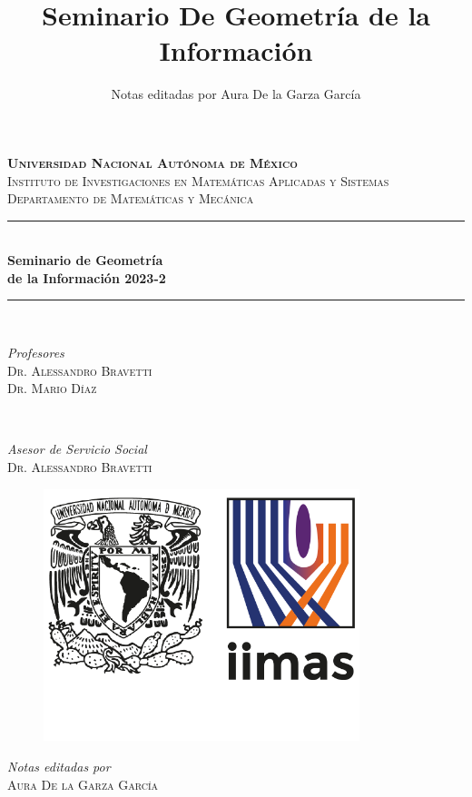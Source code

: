 \documentclass[12pt,a4paper,twoside]{report}
\title{\bfseries{Seminario De Geometr\'ia de la Informaci\'on}}
\author{Notas editadas por Aura De la Garza Garc\'ia}
\date{}
\theoremstyle{definition}
\begin{document}
\begin{titlepage} 
	\newcommand{\HRule}{\rule{\linewidth}{0.5mm}} 
	
	\center 
	\textsc{\LARGE \textbf{Universidad Nacional Aut\'onoma de M\'exico}}\\[0.9cm] 
	
	\textsc{\Large Instituto de Investigaciones en Matemáticas Aplicadas y Sistemas}\\[0.5cm] 
	
	\textsc{\large Departamento de Matem\'aticas y Mec\'anica}\\[0.5cm] 
	\HRule\\[0.4cm]
	
	{\huge\bfseries Seminario de Geometr\'ia\\
 de la Informaci\'on 2023-2}\\[0.4cm] 
	
	\HRule\\[1cm]
	
	\begin{minipage}{0.4\textwidth}
		\begin{flushleft}
			\large
			\textit{Profesores}\\
			\textsc{Dr. Alessandro Bravetti\\
   Dr. Mario D\'iaz} 
		\end{flushleft}
	\end{minipage}
	~
	\begin{minipage}{0.4\textwidth}
		\begin{flushright}
			\large
			\textit{Asesor de Servicio Social}\\
			\textsc{Dr. Alessandro Bravetti} 
		\end{flushright}
	\end{minipage}
	
    \begin{figure}[htp]
    \centering
    \includegraphics[width=9.2cm]{LogoUNAM_IIMAS_Color.png}
    \end{figure}
	
	{\large \textit{Notas editadas por} \\ \textsc{Aura De la Garza Garc\'ia}}
 
\end{titlepage}
    \tableofcontents
\end{document}
